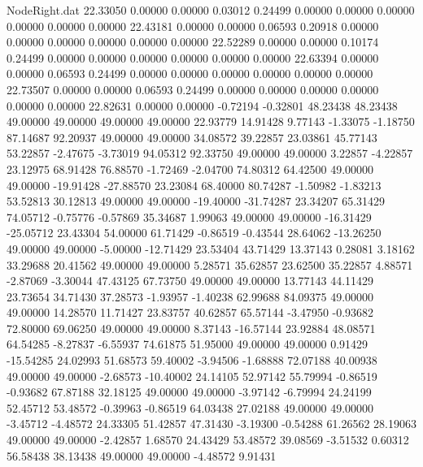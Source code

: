 \begin{filecontents}{NodeRight.dat}
  22.33050    0.00000    0.00000     0.03012    0.24499    0.00000    0.00000    0.00000    0.00000    0.00000    0.00000
  22.43181    0.00000    0.00000     0.06593    0.20918    0.00000    0.00000    0.00000    0.00000    0.00000    0.00000
  22.52289    0.00000    0.00000     0.10174    0.24499    0.00000    0.00000    0.00000    0.00000    0.00000    0.00000
  22.63394    0.00000    0.00000     0.06593    0.24499    0.00000    0.00000    0.00000    0.00000    0.00000    0.00000
  22.73507    0.00000    0.00000     0.06593    0.24499    0.00000    0.00000    0.00000    0.00000    0.00000    0.00000
  22.82631    0.00000    0.00000    -0.72194   -0.32801   48.23438   48.23438   49.00000   49.00000   49.00000   49.00000
  22.93779   14.91428    9.77143    -1.33075   -1.18750   87.14687   92.20937   49.00000   49.00000   34.08572   39.22857
  23.03861   45.77143   53.22857    -2.47675   -3.73019   94.05312   92.33750   49.00000   49.00000    3.22857   -4.22857
  23.12975   68.91428   76.88570    -1.72469   -2.04700   74.80312   64.42500   49.00000   49.00000  -19.91428  -27.88570
  23.23084   68.40000   80.74287    -1.50982   -1.83213   53.52813   30.12813   49.00000   49.00000  -19.40000  -31.74287
  23.34207   65.31429   74.05712    -0.75776   -0.57869   35.34687    1.99063   49.00000   49.00000  -16.31429  -25.05712
  23.43304   54.00000   61.71429    -0.86519   -0.43544   28.64062  -13.26250   49.00000   49.00000   -5.00000  -12.71429
  23.53404   43.71429   13.37143     0.28081    3.18162   33.29688   20.41562   49.00000   49.00000    5.28571   35.62857
  23.62500   35.22857    4.88571    -2.87069   -3.30044   47.43125   67.73750   49.00000   49.00000   13.77143   44.11429
  23.73654   34.71430   37.28573    -1.93957   -1.40238   62.99688   84.09375   49.00000   49.00000   14.28570   11.71427
  23.83757   40.62857   65.57144    -3.47950   -0.93682   72.80000   69.06250   49.00000   49.00000    8.37143  -16.57144
  23.92884   48.08571   64.54285    -8.27837   -6.55937   74.61875   51.95000   49.00000   49.00000    0.91429  -15.54285
  24.02993   51.68573   59.40002    -3.94506   -1.68888   72.07188   40.00938   49.00000   49.00000   -2.68573  -10.40002
  24.14105   52.97142   55.79994    -0.86519   -0.93682   67.87188   32.18125   49.00000   49.00000   -3.97142   -6.79994
  24.24199   52.45712   53.48572    -0.39963   -0.86519   64.03438   27.02188   49.00000   49.00000   -3.45712   -4.48572
  24.33305   51.42857   47.31430    -3.19300   -0.54288   61.26562   28.19063   49.00000   49.00000   -2.42857    1.68570
  24.43429   53.48572   39.08569    -3.51532    0.60312   56.58438   38.13438   49.00000   49.00000   -4.48572    9.91431

\end{filecontents}
